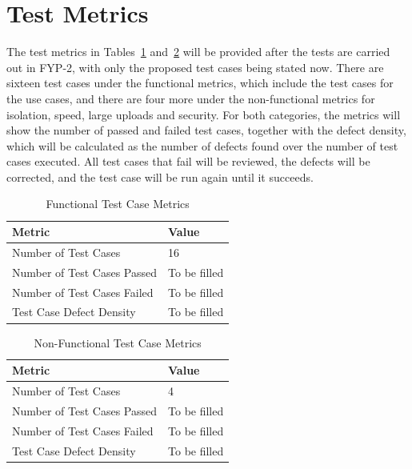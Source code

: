 \documentclass{StockSense}
\begin{document}
\FloatBarrier
\section{Test Metrics}

The test metrics in Tables~\ref{tab:metrics-functional} and~\ref{tab:metrics-nonfunctional} will be provided after the tests are carried out in FYP-2, with only the proposed test cases being stated now. There are sixteen test cases under the functional metrics, which include the test cases for the use cases, and there are four more under the non-functional metrics for isolation, speed, large uploads and security. For both categories, the metrics will show the number of passed and failed test cases, together with the defect density, which will be calculated as the number of defects found over the number of test cases executed. All test cases that fail will be reviewed, the defects will be corrected, and the test case will be run again until it succeeds.

\begin{table}[!htbp]
\centering
\caption{Functional Test Case Metrics}
\label{tab:metrics-functional}
\begin{tabular}{|l|l|}
\hline
\textbf{Metric} & \textbf{Value} \\ \hline
Number of Test Cases & 16 \\ \hline
Number of Test Cases Passed & To be filled \\ \hline
Number of Test Cases Failed & To be filled \\ \hline
Test Case Defect Density & To be filled \\ \hline
\end{tabular}
\end{table}

\begin{table}[!htbp]
\centering
\caption{Non-Functional Test Case Metrics}
\label{tab:metrics-nonfunctional}
\begin{tabular}{|l|l|}
\hline
\textbf{Metric} & \textbf{Value} \\ \hline
Number of Test Cases & 4 \\ \hline
Number of Test Cases Passed & To be filled \\ \hline
Number of Test Cases Failed & To be filled \\ \hline
Test Case Defect Density & To be filled \\ \hline
\end{tabular}
\end{table}
\end{document}

